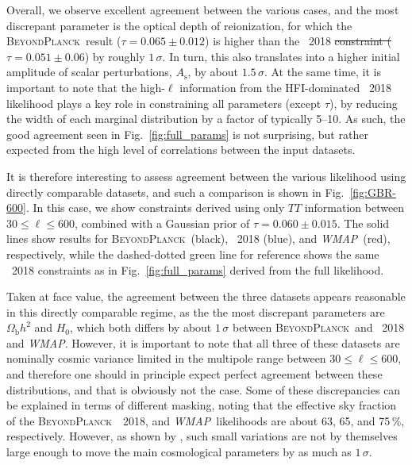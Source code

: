\documentclass[twocolumn]{aa}
\def\WMAP{\textit{WMAP}}
\newcommand{\BP}{\textsc{BeyondPlanck}}
\providecommand{\DIFaddtex}[1]{{\protect\color{blue}\uwave{#1}}} %
\providecommand{\DIFdeltex}[1]{{\protect\color{red}\sout{#1}}}                      %
\providecommand{\DIFaddbegin}{} %
\providecommand{\DIFaddend}{} %
\providecommand{\DIFdelbegin}{} %
\providecommand{\DIFdelend}{} %
\providecommand{\DIFadd}[1]{\texorpdfstring{\DIFaddtex{#1}}{#1}} %
\providecommand{\DIFdel}[1]{\texorpdfstring{\DIFdeltex{#1}}{}} %
\newcommand{\DIFscaledelfig}{0.5}
\newlength{\DIFdelgraphicswidth} %
\newlength{\DIFdelgraphicsheight} %
\newcommand{\DIFaddincludegraphics}[2][]{{\color{blue}\fbox{\DIFOincludegraphics[#1]{#2}}}} %
\newcommand{\DIFdelincludegraphics}[2][]{%
\sbox{\DIFdelgraphicsbox}{\DIFOincludegraphics[#1]{#2}}%
\settoboxwidth{\DIFdelgraphicswidth}{\DIFdelgraphicsbox} %
\settoboxtotalheight{\DIFdelgraphicsheight}{\DIFdelgraphicsbox} %
\scalebox{\DIFscaledelfig}{%
\parbox[b]{\DIFdelgraphicswidth}{\usebox{\DIFdelgraphicsbox}\\[-\baselineskip] \rule{\DIFdelgraphicswidth}{0em}}\llap{\resizebox{\DIFdelgraphicswidth}{\DIFdelgraphicsheight}{%
\setlength{\unitlength}{\DIFdelgraphicswidth}%
\begin{picture}(1,1)%
\thicklines\linethickness{2pt} %
{\color[rgb]{1,0,0}\put(0,0){\framebox(1,1){}}}%
{\color[rgb]{1,0,0}\put(0,0){\line( 1,1){1}}}%
{\color[rgb]{1,0,0}\put(0,1){\line(1,-1){1}}}%
\end{picture}%
}\hspace*{3pt}}} %
} %
\DeclareRobustCommand{\DIFaddbegin}{\DIFOaddbegin \let\includegraphics\DIFaddincludegraphics} %
\DeclareRobustCommand{\DIFaddend}{\DIFOaddend \let\includegraphics\DIFOincludegraphics} %
\DeclareRobustCommand{\DIFdelbegin}{\DIFOdelbegin \let\includegraphics\DIFdelincludegraphics} %
\DeclareRobustCommand{\DIFdelend}{\DIFOaddend \let\includegraphics\DIFOincludegraphics} %
\begin{document}
Overall, we observe excellent agreement between the various cases, and
the most discrepant parameter is the optical depth of reionization,
for which the \BP\ result ($\tau=0.065\pm0.012$) is higher than the
\Planck\ 2018 \DIFdelbegin \DIFdel{constraint ($\tau=0.051\pm0.06$}\DIFdelend \DIFaddbegin \DIFadd{(TT + lowE) constraint ($\tau=0.052\pm0.008$}\DIFaddend ) by roughly
$1\,\sigma$. In turn, this also translates into a higher initial
amplitude of scalar perturbations, $A_{\mathrm{s}}$, by about
$1.5\,\sigma$. At the same time, it is important to note that the
high-$\ell$ information from the HFI-dominated \Planck\ 2018
likelihood plays a key role in constraining all parameters (except
$\tau$), by reducing the width of each marginal distribution by a
factor of typically 5--10. As such, the good agreement seen in
Fig.~\ref{fig:full_params} is not surprising, but rather expected from
the high level of correlations between the input datasets.

It is therefore interesting to assess agreement between the various
likelihood using directly comparable datasets, and such a comparison
is shown in Fig.~\ref{fig:GBR-600}. In this case, we show constraints
derived using only $TT$ information between $30\le\ell\le600$,
combined with a Gaussian prior of $\tau=0.060\pm0.015$. The solid
lines show results for \BP\ (black), \Planck\ 2018 (blue), and
\WMAP\ (red), respectively, while the dashed-dotted green line for
reference shows the same \Planck\ 2018 constraints as in
Fig.~\ref{fig:full_params} derived from the full likelihood.

Taken at face value, the agreement between the three datasets appears
reasonable in this directly comparable regime, as the the most
discrepant parameters are $\Omega_{\mathrm{b}}h^2$ and $H_0$, which
both differs by about $1\,\sigma$ between \BP\ and \Planck\ 2018 and
\WMAP. However, it is important to note that all three of these datasets
are nominally cosmic variance limited in the multipole range between
$30\le\ell\le 600$, and therefore one should in principle expect
perfect agreement between these distributions, and that is obviously
not the case. Some of these discrepancies can be explained in terms of
different masking, noting that the effective sky fraction of the \BP\,
\Planck\ 2018, and \WMAP\ likelihoods are about 63, 65, and 75\,\%,
respectively. However, as shown by \citet{planck2016-l05}, such small
variations are not by themselves large enough to move the main
cosmological parameters by as much as $1\,\sigma$.
\end{document}
